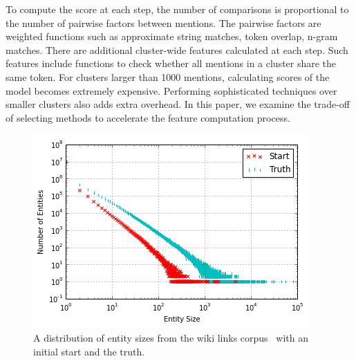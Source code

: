 To compute the score at each step, the number of comparisons is proportional to the number of pairwise factors between mentions.
The pairwise factors are weighted functions such as approximate string matches, token overlap, n-gram matches.
There are additional cluster-wide features calculated at each step.
Such features include functions to check whether all mentions in a cluster share the same token.
For clusters larger than 1000 mentions, calculating scores of the model becomes extremely expensive.
Performing sophisticated techniques over smaller clusters also adds extra overhead.
In this paper, we examine the trade-off of selecting methods to
accelerate the feature computation process.


\begin{figure}
\centering
\includegraphics[width=\columnwidth]{media/start-vs-nd.png}
\caption{A distribution of entity sizes from the wiki links corpus~\cite{singh12:wiki-links} with an initial start and the truth.}
\label{fig:entity-distribution}
\end{figure}


